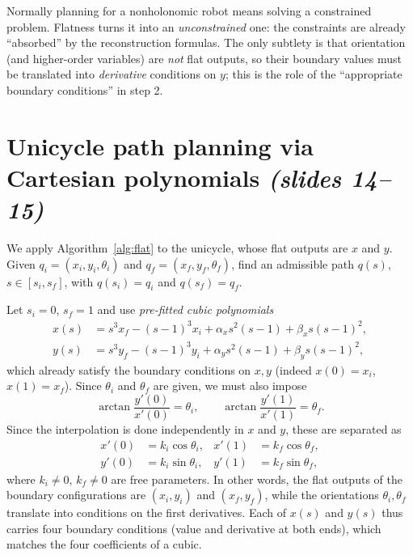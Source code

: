 \documentclass[11pt,a4paper]{article}
\def\boldsymbol#1{#1}%
\newcommand{\q}{\boldsymbol{q}}
\newcommand{\qi}{\boldsymbol{q}_i}
\newcommand{\qf}{\boldsymbol{q}_f}
\theoremstyle{definition}
\theoremstyle{plain}
\theoremstyle{remark}
\begin{document}
\begin{intuition}
Normally planning for a nonholonomic robot means solving a constrained problem. Flatness turns it into an
\emph{unconstrained} one: the constraints are already ``absorbed'' by the reconstruction formulas. The only subtlety is that
orientation (and higher-order variables) are \emph{not} flat outputs, so their boundary values must be translated into
\emph{derivative} conditions on $\boldsymbol y$; this is the role of the ``appropriate boundary conditions'' in step 2.
\end{intuition}

\section{Unicycle path planning via Cartesian polynomials \emph{(slides 14--15)}}
We apply Algorithm~\ref{alg:flat} to the unicycle, whose flat outputs are $x$ and $y$. Given $\qi=(x_i,y_i,\theta_i)$ and
$\qf=(x_f,y_f,\theta_f)$, find an admissible path $\q(s)$, $s\in[s_i,s_f]$, with $\q(s_i)=\qi$ and $\q(s_f)=\qf$.

Let $s_i=0$, $s_f=1$ and use \emph{pre-fitted cubic polynomials}
\begin{align}
x(s)&=s^3x_f-(s-1)^3x_i+\alpha_x s^2(s-1)+\beta_x s(s-1)^2,\\
y(s)&=s^3y_f-(s-1)^3y_i+\alpha_y s^2(s-1)+\beta_y s(s-1)^2,
\end{align}
which already satisfy the boundary conditions on $x,y$ (indeed $x(0)=x_i$, $x(1)=x_f$). Since $\theta_i$ and $\theta_f$ are
given, we must also impose
\begin{equation}
\arctan\frac{y'(0)}{x'(0)}=\theta_i,\qquad \arctan\frac{y'(1)}{x'(1)}=\theta_f .
\end{equation}
Since the interpolation is done independently in $x$ and $y$, these are separated as
\begin{equation}
\begin{aligned}
x'(0)&=k_i\cos\theta_i, & x'(1)&=k_f\cos\theta_f,\\
y'(0)&=k_i\sin\theta_i, & y'(1)&=k_f\sin\theta_f,
\end{aligned}
\end{equation}
where $k_i\ne0$, $k_f\ne0$ are free parameters.
In other words, the flat outputs of the boundary configurations are $(x_i,y_i)$ and $(x_f,y_f)$, while the orientations $\theta_i,\theta_f$ translate into conditions on the first derivatives. Each of $x(s)$ and $y(s)$ thus carries four boundary conditions (value and derivative at both ends), which matches the four coefficients of a cubic.
\end{document}
